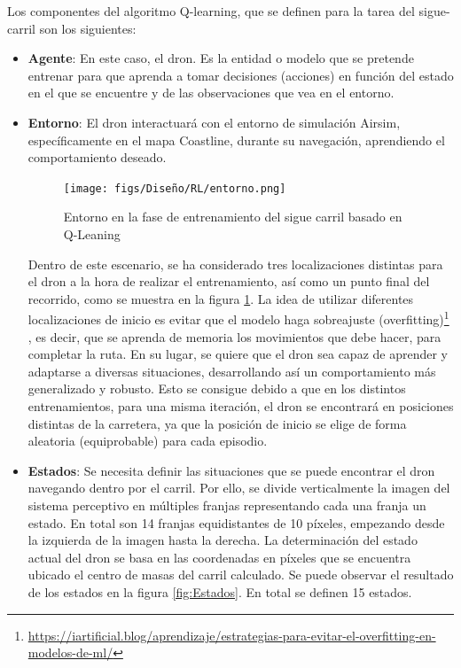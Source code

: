   Los componentes del algoritmo Q-learning, que se definen para la tarea del sigue-carril son los siguientes: 
  \begin{itemize} 
    \item \textbf{Agente}: En este caso, el dron. Es la entidad o modelo que se pretende entrenar para que aprenda a tomar decisiones (acciones) en función del estado en el que se 
    encuentre y de las observaciones que vea en el entorno. 
    
    \item \textbf{Entorno}: El dron interactuará con el entorno de simulación Airsim, específicamente en el mapa Coastline, durante su navegación, aprendiendo el comportamiento deseado.

    \begin{figure} [H]
      \begin{center}
        \texttt{[image: figs/Diseño/RL/entorno.png]}
      \end{center}
      \caption{Entorno en la fase de entrenamiento del sigue carril basado en Q-Leaning}
      \label{fig:Entorno}
      \vspace{-1.5em}
    \end{figure}

    Dentro de este escenario, se ha considerado tres localizaciones distintas para el dron a la hora de realizar el entrenamiento, así como un punto final del recorrido, como se muestra en la figura
    \ref{fig:Entorno}. La idea de utilizar diferentes localizaciones de inicio es evitar que el modelo haga sobreajuste (overfitting)\footnote{\url{https://iartificial.blog/aprendizaje/estrategias-para-evitar-el-overfitting-en-modelos-de-ml/}} 
    , es decir, que se aprenda de memoria los movimientos que debe hacer, para completar la ruta. En su lugar, se quiere que el dron 
    sea capaz de aprender y adaptarse a diversas situaciones, desarrollando así un comportamiento más generalizado y robusto. Esto se consigue debido a que en los distintos 
    entrenamientos, para una misma iteración, el dron se encontrará en posiciones distintas de la carretera, ya que la posición de inicio se elige de forma aleatoria (equiprobable) para cada
    episodio.
    
    \item \textbf{Estados}: Se necesita definir las situaciones que se puede encontrar el dron navegando dentro  por el carril. Por ello, se divide verticalmente la imagen del sistema perceptivo
    en múltiples franjas representando cada una franja un estado. En total son 14 franjas equidistantes de 10 píxeles, empezando desde la izquierda de la imagen hasta la derecha. La determinación
    del estado actual del dron se basa en las coordenadas en píxeles que se encuentra ubicado el centro de masas del carril calculado. Se puede observar el 
    resultado de los estados en la figura \ref{fig:Estados}. En total se definen 15 estados.
    

\end{itemize}
